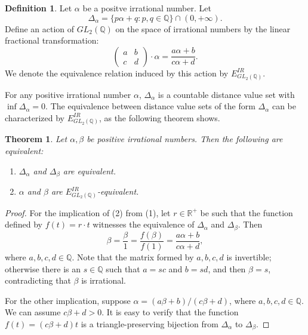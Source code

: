 \documentclass{amsart}
\newtheorem{theorem}{Theorem}[section]
\theoremstyle{definition}
\newtheorem{definition}{Definition}[section]
\theoremstyle{remark}
\begin{document}
     \begin{definition}
        Let $\alpha$ be a positve irrational number. Let 
$$\Delta_\alpha = \{p\alpha + q: p,q \in \mathbb{Q}\} \cap (0,+\infty). $$ 
Define an action of $GL_2(\mathbb{Q})$ on the space of irrational numbers by the linear fractional transformation: 
        \begin{equation*}
            \begin{pmatrix}
                a & b \\
                c & d
            \end{pmatrix} \cdot \alpha = \frac{a\alpha+b}{c\alpha+d}. 
 \end{equation*} 
We denote the equivalence relation induced by this action by $E_{GL_2(\mathbb{Q})}^{IR}$.        

 \end{definition}

For any positive irrational number $\alpha$, $\Delta_\alpha$ is a countable distance value set with $\inf\Delta_\alpha=0$. The equivalence between distance value sets of the form $\Delta_\alpha$ can be characterized by $E_{GL_2(\mathbb{Q})}^{IR}$, as the following theorem shows. 
     \begin{theorem}\label{thm:Deltaalpha}
        Let $\alpha, \beta$ be positive irrational numbers. Then the following are equivalent: 
        \begin{enumerate}
            \item[\rm (1)] $\Delta_\alpha$ and $\Delta_\beta$ are equivalent. 
            \item[\rm (2)] $\alpha$ and $\beta$ are $E_{GL_2(\mathbb{Q})}^{IR}$-equivalent. 
        \end{enumerate}
     \end{theorem}
     \begin{proof}
        For the implication of (2) from (1), let $r \in \mathbb{R}^+$ be such that the function defined by $f(t) = r\cdot t$ witnesses the equivalence of $\Delta_\alpha$ and $\Delta_\beta$. Then 
$$\beta = \frac{\beta}{1}=\frac{f(\beta)}{f(1)} = \frac{a\alpha + b}{c\alpha + d},$$ where $a,b,c,d \in \mathbb{Q}$. Note that the matrix formed by $a,b,c,d$ is invertible; otherwise there is an $s \in \mathbb{Q}$ such that $a = sc$ and $b=sd$, and then $\beta = s $, contradicting that $\beta$ is irrational. 
        
        For the other implication, suppose $\alpha =({a\beta + b})/({c\beta + d})$, where $a, b, c, d\in\mathbb{Q}$. We can assume $c\beta + d >0$. It is easy to verify that the function $f(t) = (c\beta + d)t$ is a triangle-preserving bijection from $\Delta_\alpha$ to $\Delta_\beta$. 
     \end{proof}
\end{document}
